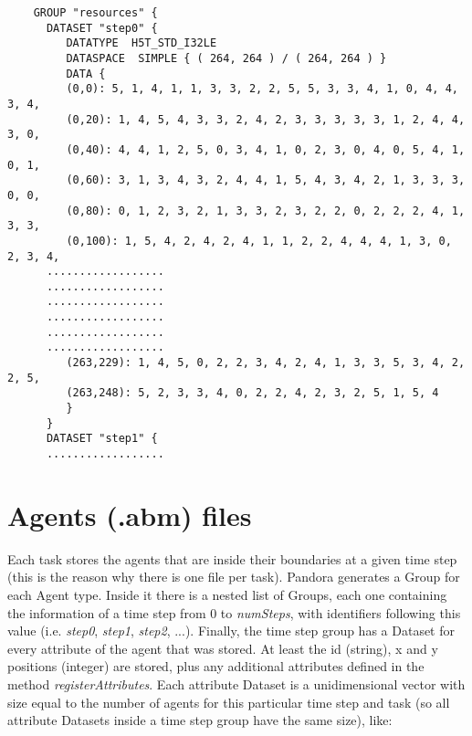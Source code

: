 \documentclass[a4paper,10pt]{article}
\begin{document}
\begin{verbatim}
    GROUP "resources" {
      DATASET "step0" {
         DATATYPE  H5T_STD_I32LE
         DATASPACE  SIMPLE { ( 264, 264 ) / ( 264, 264 ) }
         DATA {
         (0,0): 5, 1, 4, 1, 1, 3, 3, 2, 2, 5, 5, 3, 3, 4, 1, 0, 4, 4, 3, 4,
         (0,20): 1, 4, 5, 4, 3, 3, 2, 4, 2, 3, 3, 3, 3, 3, 1, 2, 4, 4, 3, 0,
         (0,40): 4, 4, 1, 2, 5, 0, 3, 4, 1, 0, 2, 3, 0, 4, 0, 5, 4, 1, 0, 1,
         (0,60): 3, 1, 3, 4, 3, 2, 4, 4, 1, 5, 4, 3, 4, 2, 1, 3, 3, 3, 0, 0,
         (0,80): 0, 1, 2, 3, 2, 1, 3, 3, 2, 3, 2, 2, 0, 2, 2, 2, 4, 1, 3, 3,
         (0,100): 1, 5, 4, 2, 4, 2, 4, 1, 1, 2, 2, 4, 4, 4, 1, 3, 0, 2, 3, 4,
	  ..................
	  ..................
	  ..................
	  ..................
	  ..................
	  ..................
         (263,229): 1, 4, 5, 0, 2, 2, 3, 4, 2, 4, 1, 3, 3, 5, 3, 4, 2, 2, 5,
         (263,248): 5, 2, 3, 3, 4, 0, 2, 2, 4, 2, 3, 2, 5, 1, 5, 4
         }
      }
      DATASET "step1" {
	  ..................
\end{verbatim}

\section{Agents (.abm) files}

Each task stores the agents that are inside their boundaries at a given time step (this is the reason why there is one file per task). Pandora generates a Group for each Agent type. Inside it there is a nested list of Groups, each one containing the information of a time step from 0 to \textit{numSteps}, with identifiers following this value (i.e. \textit{step0}, \textit{step1}, \textit{step2}, ...).
Finally, the time step group has a Dataset for every attribute of the agent that was stored. At least the id (string), x and y positions (integer) are stored, plus any additional attributes defined in the method \textit{registerAttributes}. Each attribute Dataset is a unidimensional vector with size equal to the number of agents for this particular time step and task (so all attribute Datasets inside a time step group have the same size), like:
\end{document}
